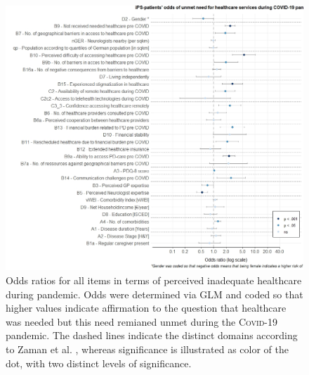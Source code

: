 \documentclass[a4paper,oneside,11pt,english]{scrartcl}
\begin{document}
\begin{figure}[!h]
	\centering
	\includegraphics[width=\textwidth]{fig3.oddsratios.v1.0.jpeg}
	\caption{Odds ratios for all items in terms of perceived inadequate healthcare during pandemic. Odds were determined via \textsc{GLM} and coded so that higher values indicate affirmation to the question that healthcare was needed but this need remianed unmet during the \textsc{Covid}-19 pandemic. The dashed lines indicate the distinct domains according to Zaman et al. \cite{zaman2021barriers}, whereas significance is illustrated as color of the dot, with two distinct levels of significance. }
	\label{fig3:resultsOR1}
\end{figure}
\end{document}
